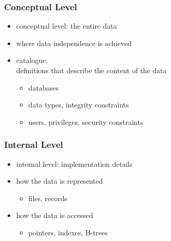 \documentclass[dvipsnames]{beamer}
\theoremstyle{plain}
\begin{document}
\begin{frame}
  \frametitle{Conceptual Level}

  \begin{itemize}
    \item conceptual level: the entire data
    \item where data independence is achieved

    \pause
    \bigskip
    \item \alert{catalogue}:\\
      definitions that describe the content of the data
    \begin{itemize}
      \item databases
      \item data types, integrity constraints
      \item users, privileges, security constraints
    \end{itemize}
  \end{itemize}
\end{frame}

\begin{frame}
  \frametitle{Internal Level}

  \begin{itemize}
    \item internal level: implementation details

    \pause
    \medskip
    \item how the data is represented
    \begin{itemize}
      \item files, records
    \end{itemize}

    \item how the data is accessed
    \begin{itemize}
      \item pointers, indexes, B-trees
    \end{itemize}
  \end{itemize}
\end{frame}
\end{document}
